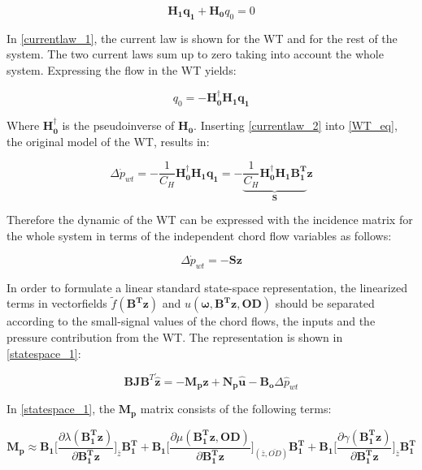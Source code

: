 \begin{equation}
 \bm{H_1}\bm{q_1} + \bm{H_0}q_0 = 0 
 \label{currentlaw_1}
\end{equation}

In \eqref{currentlaw_1}, the current law is shown for the WT and for the rest of the system. The two current laws sum up to zero taking into account the whole system. Expressing the flow in the WT yields:

\begin{equation}
q_0 = -\bm{H^{\dagger}_0}\bm{H_1}\bm{q_1}
 \label{currentlaw_2}
\end{equation}

Where $\bm{H^{\dagger}_0}$ is the pseudoinverse of $\bm{H_0}$. Inserting \eqref{currentlaw_2} into \eqref{WT_eq}, the original model of the WT, results in:

\begin{equation}
\Delta \dot{p}_{wt} = - \frac{1}{C_H} \bm{H^{\dagger}_0}\bm{H_1}\bm{q_1} = - \underbrace{\frac{1}{C_H} \bm{H^{\dagger}_0}\bm{H_1}\bm{{B_1^{T}}}}_{\bm{S}} \bm{z}
 \label{currentlaw_3}
\end{equation}

Therefore the dynamic of the WT can be expressed with the incidence matrix for the whole system in terms of the independent chord flow variables as follows: 

\begin{equation}
\Delta \dot{p}_{wt} = - \bm{S} \bm{z}
 \label{currentlaw_4}
\end{equation}

In order to formulate a linear standard state-space representation, the linearized terms in vectorfields $\tilde f(\bm{B^T}\bm{z})$ and $u(\bm{\omega},\bm{B^T}\bm{z},\bm{OD})$ should be separated according to the small-signal values of the chord flows, the inputs and the pressure contribution from the WT. The representation is shown in \eqref{statespace_1}: 

\begin{equation}
 \bm{B}\bm{J {B}}^T \bm{\dot{\hat{z}}} = -\bm{M_p} \bm{\hat{z}} + \bm{N_p} \bm{\hat{u}} - \bm{B_o} \Delta \hat{p}_{wt}    
 \label{statespace_1}
\end{equation}

In \eqref{statespace_1}, the $\bm{M_p}$ matrix consists of the following terms: 

\begin{equation}
  \bm{M_p} \approx \bm{B_1} \bigg[ \frac{\partial{\lambda(\bm{{B_1^{T}}}\bm{z})}}{{\partial{\bm{{B_1^{T}}}\bm{z}}}}   \bigg]_{\bar{z}} \bm{{B_1^{T}}} +  \bm{B_1} \bigg[ \frac{\partial{\mu(\bm{{B_1^{T}}}\bm{z}, \bm{OD})}}{{\partial{\bm{{B_1^{T}}}\bm{z}}}}  \bigg]_{(\bar{z}, \bar{OD})} \bm{{B_1^{T}}} +  \bm{B_1} \bigg[ \frac{\partial{\gamma(\bm{{B_1^{T}}}\bm{z})}}{{\partial{\bm{{B_1^{T}}}\bm{z}}}}   \bigg]_{\bar{z}} \bm{{B_1^{T}}}
\label{Amatrix}
\end{equation}

